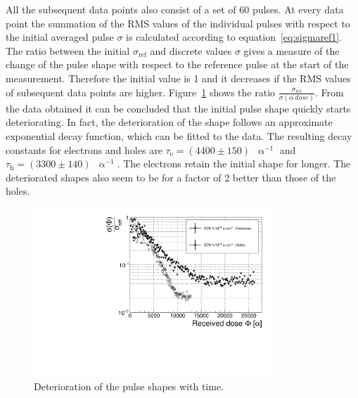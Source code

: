All the subsequent data points also consist of a set of 60 pulses. At every data point the summation of the RMS values of the individual pulses with respect to the initial averaged pulse $\sigma$ is calculated according to equation~\ref{eq:sigmaref1}. The ratio between the initial $\sigma_{\mathrm{ref}}$ and discrete values $\sigma$ gives a measure of the change of the pulse shape with respect to the reference pulse at the start of the measurement. Therefore the initial value is 1 and it decreases if the RMS values of subsequent data points are higher.
Figure~\ref{fig:longtermc2corr} shows the ratio $\frac{\sigma_\mathrm{ref} }{\sigma(\alpha~dose)}$. From the data obtained it can be concluded that the initial pulse shape quickly starts deteriorating. In fact, the deterioration of the shape follows an approximate exponential decay function, which can be fitted to the data. The resulting decay constants for electrons and holes are $\tau_{\mathrm{e}}=(4400\pm150)$~$\upalpha^{-1}$ and $\tau_{\mathrm{h}}=(3300\pm140)$~$\upalpha^{-1}$. The electrons retain the initial shape for longer. The deteriorated shapes also seem to be for a factor of 2 better than those of the holes. 

\begin{figure}[!t]
\begin{center}
\includegraphics[width=0.8\textwidth]{03_measurement_results/scripts/plots/plotLifetime/corrlifetime}
\caption{Deterioration of the pulse shapes with time.}
\label{fig:longtermc2corr}
\end{center}
\end{figure}


